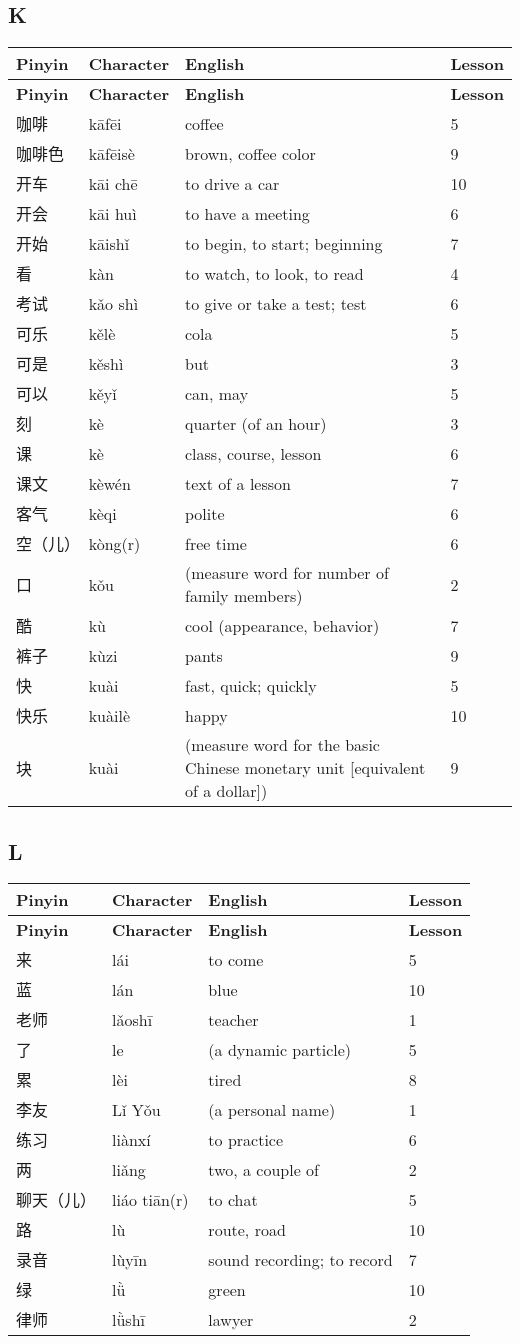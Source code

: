 \documentclass[12pt]{article}
\newcommand{\vocabitem}[4]{%
  #1 & #2 & #3 & #4 \\ \midrule
}
\begin{document}
\subsection*{K}
\begin{longtable}{P{\dimexpr\textwidth/4\relax}P{\dimexpr\textwidth/4\relax}P{\dimexpr\textwidth/4\relax}P{\dimexpr\textwidth/4\relax}}
\toprule
\textbf{Pinyin} & \textbf{Character} & \textbf{English} & \textbf{Lesson} \\
\midrule
\endfirsthead
\toprule
\textbf{Pinyin} & \textbf{Character} & \textbf{English} & \textbf{Lesson} \\
\midrule
\endhead
\vocabitem{咖啡}{kāfēi}{coffee}{5}
\vocabitem{咖啡色}{kāfēisè}{brown, coffee color}{9}
\vocabitem{开车}{kāi chē}{to drive a car}{10}
\vocabitem{开会}{kāi huì}{to have a meeting}{6}
\vocabitem{开始}{kāishǐ}{to begin, to start; beginning}{7}
\vocabitem{看}{kàn}{to watch, to look, to read}{4}
\vocabitem{考试}{kǎo shì}{to give or take a test; test}{6}
\vocabitem{可乐}{kělè}{cola}{5}
\vocabitem{可是}{kěshì}{but}{3}
\vocabitem{可以}{kěyǐ}{can, may}{5}
\vocabitem{刻}{kè}{quarter (of an hour)}{3}
\vocabitem{课}{kè}{class, course, lesson}{6}
\vocabitem{课文}{kèwén}{text of a lesson}{7}
\vocabitem{客气}{kèqi}{polite}{6}
\vocabitem{空（儿）}{kòng(r)}{free time}{6}
\vocabitem{口}{kǒu}{(measure word for number of family members)}{2}
\vocabitem{酷}{kù}{cool (appearance, behavior)}{7}
\vocabitem{裤子}{kùzi}{pants}{9}
\vocabitem{快}{kuài}{fast, quick; quickly}{5}
\vocabitem{快乐}{kuàilè}{happy}{10}
\vocabitem{块}{kuài}{(measure word for the basic Chinese monetary unit [equivalent of a dollar])}{9}
\end{longtable}

\subsection*{L}
\begin{longtable}{P{\dimexpr\textwidth/4\relax}P{\dimexpr\textwidth/4\relax}P{\dimexpr\textwidth/4\relax}P{\dimexpr\textwidth/4\relax}}
\toprule
\textbf{Pinyin} & \textbf{Character} & \textbf{English} & \textbf{Lesson} \\
\midrule
\endfirsthead
\toprule
\textbf{Pinyin} & \textbf{Character} & \textbf{English} & \textbf{Lesson} \\
\midrule
\endhead
\vocabitem{来}{lái}{to come}{5}
\vocabitem{蓝}{lán}{blue}{10}
\vocabitem{老师}{lǎoshī}{teacher}{1}
\vocabitem{了}{le}{(a dynamic particle)}{5}
\vocabitem{累}{lèi}{tired}{8}
\vocabitem{李友}{Lǐ Yǒu}{(a personal name)}{1}
\vocabitem{练习}{liànxí}{to practice}{6}
\vocabitem{两}{liǎng}{two, a couple of}{2}
\vocabitem{聊天（儿）}{liáo tiān(r)}{to chat}{5}
\vocabitem{路}{lù}{route, road}{10}
\vocabitem{录音}{lùyīn}{sound recording; to record}{7}
\vocabitem{绿}{lǜ}{green}{10}
\vocabitem{律师}{lǜshī}{lawyer}{2}
\end{longtable}
\end{document}
